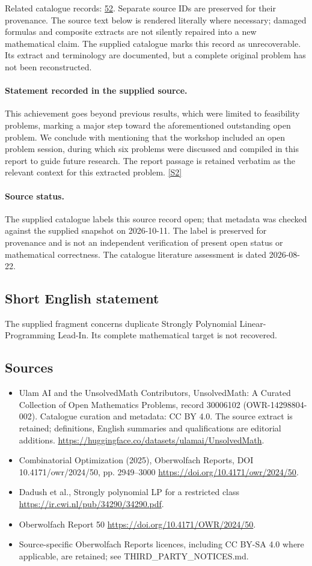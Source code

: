 \documentclass[11pt]{article}
\begin{document}
Related catalogue records: \href{https://mehmetmars7.github.io/Erdosproblems-llm-hunter/problem.html?type=open_problems&id=52}{52}. Separate source IDs are preserved for their provenance.
The source text below is rendered literally where necessary; damaged formulas and composite extracts are not silently repaired into a new mathematical claim.
The supplied catalogue marks this record as unrecoverable. Its extract and terminology are documented, but a complete original problem has not been reconstructed.
\paragraph{Statement recorded in the supplied source.}
This achievement goes beyond previous results, which were limited to feasibility problems, marking a major step toward the aforementioned outstanding open problem. We conclude with mentioning that the workshop included an open problem session, during which six problems were discussed and compiled in this report to guide future research. The report passage is retained verbatim as the relevant context for this extracted problem. \href{https://doi.org/10.4171/owr/2024/50}{[S2]}
\paragraph{Source status.}
The supplied catalogue labels this source record open; that metadata was checked against the supplied snapshot on 2026-10-11. The label is preserved for provenance and is not an independent verification of present open status or mathematical correctness. The catalogue literature assessment is dated 2026-08-22.
\subsection{Short English statement}
The supplied fragment concerns duplicate Strongly Polynomial Linear-Programming Lead-In. Its complete mathematical target is not recovered.
\subsection{Sources}
\begin{itemize}
\item[S1] Ulam AI and the UnsolvedMath Contributors, UnsolvedMath: A Curated Collection of Open Mathematics Problems, record 30006102 (OWR-14298804-002). Catalogue curation and metadata: CC BY 4.0. The source extract is retained; definitions, English summaries and qualifications are editorial additions.
\url{https://huggingface.co/datasets/ulamai/UnsolvedMath}.
\item[S2] Combinatorial Optimization (2025), Oberwolfach Reports, DOI 10.4171/owr/2024/50, pp. 2949--3000
\url{https://doi.org/10.4171/owr/2024/50}.
\item[S3] Dadush et al., Strongly polynomial LP for a restricted class
\url{https://ir.cwi.nl/pub/34290/34290.pdf}.
\item[S4] Oberwolfach Report 50
\url{https://doi.org/10.4171/OWR/2024/50}.
\item Source-specific Oberwolfach Reports licences, including CC BY-SA 4.0 where applicable, are retained; see THIRD\_PARTY\_NOTICES.md.
\end{itemize}
\end{document}
